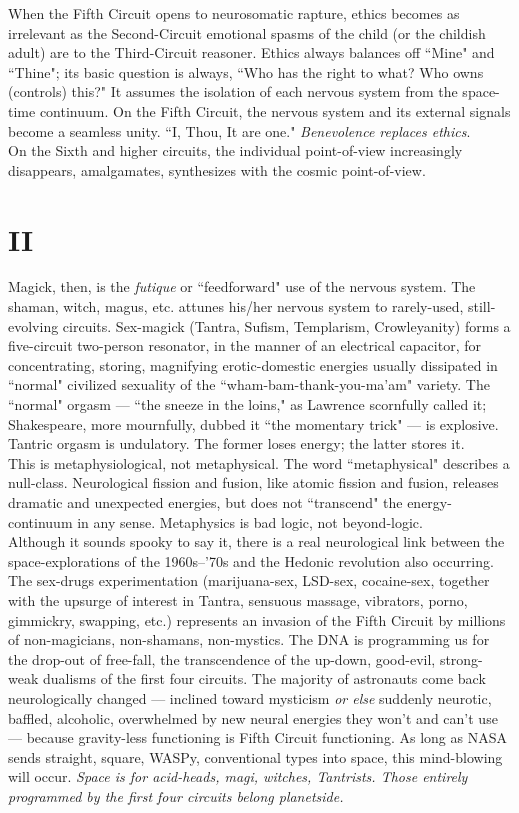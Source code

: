 When the Fifth Circuit opens to neurosomatic rapture, ethics becomes as irrelevant as the Second-Circuit emotional spasms of the child (or the childish adult) are to the Third-Circuit reasoner. Ethics always balances off ``Mine" and ``Thine"; its basic question is always, ``Who has the right to what? Who owns (controls) this?" It assumes the isolation of each nervous system from the space-time continuum. On the Fifth Circuit, the nervous system and its external signals become a seamless unity. ``I, Thou, It are one." \emph{Benevolence replaces ethics}.\\
On the Sixth and higher circuits, the individual point-of-view increasingly disappears, amalgamates, synthesizes with the cosmic point-of-view.

\section*{II}
Magick, then, is the \emph{futique} or ``feedforward" use of the nervous system. The shaman, witch, magus, etc. attunes his/her nervous system to rarely-used, still-evolving circuits. Sex-magick (Tantra, Sufism, Templarism, Crowleyanity) forms a five-circuit two-person resonator, in the manner of an electrical capacitor, for concentrating, storing, magnifying erotic-domestic energies usually dissipated in ``normal" civilized sexuality of the ``wham-bam-thank-you-ma'am" variety. The ``normal" orgasm --- ``the sneeze in the loins," as Lawrence scornfully called it; Shakespeare, more mournfully, dubbed it ``the momentary trick" --- is explosive. Tantric orgasm is undulatory. The former loses energy; the latter stores it.\\
This is metaphysiological, not metaphysical. The word ``metaphysical" describes a null-class. Neurological fission and fusion, like atomic fission and fusion, releases dramatic and unexpected energies, but does not ``transcend" the energy-continuum in any sense. Metaphysics is bad logic, not beyond-logic.\\
Although it sounds spooky to say it, there is a real neurological link between the space-explorations of the 1960s--'70s and the Hedonic revolution also occurring. The sex-drugs experimentation (marijuana-sex, LSD-sex, cocaine-sex, together with the upsurge of interest in Tantra, sensuous massage, vibrators, porno, gimmickry, swapping, etc.) represents an invasion of the Fifth Circuit by millions of non-magicians, non-shamans, non-mystics. The DNA is programming us for the drop-out of free-fall, the transcendence of the up-down, good-evil, strong-weak dualisms of the first four circuits. The majority of astronauts come back neurologically changed --- inclined toward mysticism \emph{or else} suddenly neurotic, baffled, alcoholic, overwhelmed by new neural energies they won't and can't use --- because gravity-less functioning is Fifth Circuit functioning. As long as NASA sends straight, square, WASPy, conventional types into space, this mind-blowing will occur. \emph{Space is for acid-heads, magi, witches, Tantrists. Those entirely programmed by the first four circuits belong planetside.}\\
